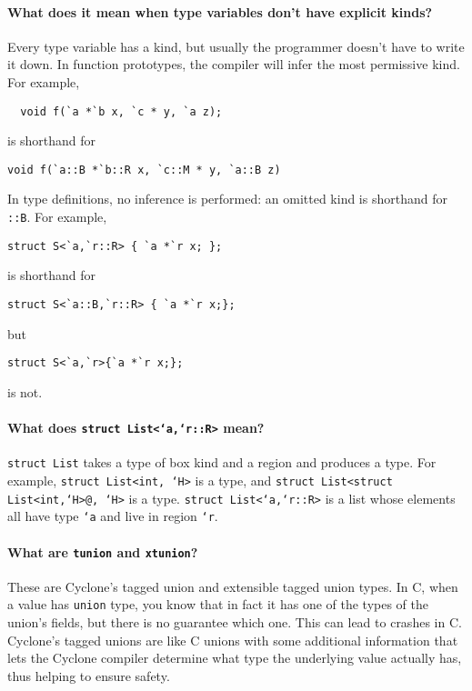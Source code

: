 \paragraph{What does it mean when type variables don't have explicit
  kinds?}

Every type variable has a kind, but usually the programmer doesn't
have to write it down.  In function prototypes, the compiler will
infer the most permissive kind.  For example,
\begin{verbatim}
  void f(`a *`b x, `c * y, `a z);
\end{verbatim}
is shorthand for
\begin{verbatim}
void f(`a::B *`b::R x, `c::M * y, `a::B z)
\end{verbatim}
In type definitions, no inference is performed: an omitted kind is
shorthand for \texttt{::B}.  For example,
\begin{verbatim}
struct S<`a,`r::R> { `a *`r x; };
\end{verbatim}
is shorthand for
\begin{verbatim}
struct S<`a::B,`r::R> { `a *`r x;};
\end{verbatim}
but
\begin{verbatim}
struct S<`a,`r>{`a *`r x;};
\end{verbatim}
is not.

\paragraph{What does \texttt{struct List<`a,`r::R>} mean?}

\texttt{struct List} takes a type of box kind and a region and
produces a type.  For example, \texttt{struct List<int, `H>} is a
type, and \texttt{struct List<struct List<int,`H>@, `H>} is a type.
\texttt{struct List<`a,`r::R>} is a list whose elements all have type
\texttt{`a} and live in region \texttt{`r}.

\paragraph{What are \texttt{tunion} and \texttt{xtunion}?}

These are Cyclone's tagged union and extensible tagged union types.
In C, when a value has \texttt{union} type, you know that in fact it
has one of the types of the union's fields, but there is no guarantee
which one.  This can lead to crashes in C\@.  Cyclone's tagged unions
are like C unions with some additional information that lets the
Cyclone compiler determine what type the underlying value actually
has, thus helping to ensure safety.

